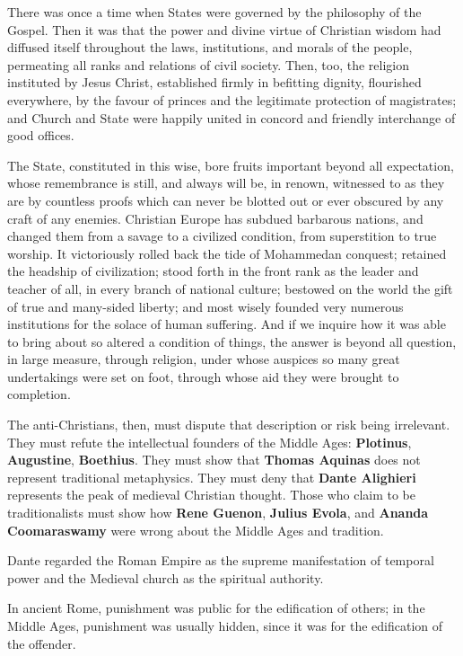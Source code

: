 \begin{quotex}
There was once a time when States were governed by the philosophy of the Gospel. Then it was that the power and divine virtue of Christian wisdom had diffused itself throughout the laws, institutions, and morals of the people, permeating all ranks and relations of civil society. Then, too, the religion instituted by Jesus Christ, established firmly in befitting dignity, flourished everywhere, by the favour of princes and the legitimate protection of magistrates; and Church and State were happily united in concord and friendly interchange of good offices.

The State, constituted in this wise, bore fruits important beyond all expectation, whose remembrance is still, and always will be, in renown, witnessed to as they are by countless proofs which can never be blotted out or ever obscured by any craft of any enemies. Christian Europe has subdued barbarous nations, and changed them from a savage to a civilized condition, from superstition to true worship. It victoriously rolled back the tide of Mohammedan conquest; retained the headship of civilization; stood forth in the front rank as the leader and teacher of all, in every branch of national culture; bestowed on the world the gift of true and many-sided liberty; and most wisely founded very numerous institutions for the solace of human suffering. And if we inquire how it was able to bring about so altered a condition of things, the answer is beyond all question, in large measure, through religion, under whose auspices so many great undertakings were set on foot, through whose aid they were brought to completion.
\end{quotex}


The anti-Christians, then, must dispute that description or risk being irrelevant. They must refute the intellectual founders of the Middle Ages: \textbf{Plotinus}, \textbf{Augustine}, \textbf{Boethius}. They must show that \textbf{Thomas Aquinas} does not represent traditional metaphysics. They must deny that \textbf{Dante Alighieri} represents the peak of medieval Christian thought. Those who claim to be traditionalists must show how \textbf{Rene Guenon}, \textbf{Julius Evola}, and \textbf{Ananda Coomaraswamy} were wrong about the Middle Ages and tradition.

Dante regarded the Roman Empire as the supreme manifestation of temporal power and the Medieval church as the spiritual authority.

In ancient Rome, punishment was public for the edification of others; in the Middle Ages, punishment was usually hidden, since it was for the edification of the offender.

